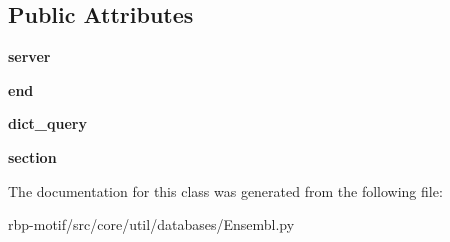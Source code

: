 \subsection*{Public Attributes}
\begin{DoxyCompactItemize}
\item 
\hypertarget{classsrc_1_1core_1_1util_1_1databases_1_1Ensembl_1_1Ensembl_a151c76933d0a67aed4cbf40de94c792e}{{\bfseries server}}\label{classsrc_1_1core_1_1util_1_1databases_1_1Ensembl_1_1Ensembl_a151c76933d0a67aed4cbf40de94c792e}

\item 
\hypertarget{classsrc_1_1core_1_1util_1_1databases_1_1Ensembl_1_1Ensembl_af4bc1c81978e0d06512fdec5330f46a2}{{\bfseries end}}\label{classsrc_1_1core_1_1util_1_1databases_1_1Ensembl_1_1Ensembl_af4bc1c81978e0d06512fdec5330f46a2}

\item 
\hypertarget{classsrc_1_1core_1_1util_1_1databases_1_1Ensembl_1_1Ensembl_ab7d59100515d2843950b7208db4a90ab}{{\bfseries dict\-\_\-query}}\label{classsrc_1_1core_1_1util_1_1databases_1_1Ensembl_1_1Ensembl_ab7d59100515d2843950b7208db4a90ab}

\item 
\hypertarget{classsrc_1_1core_1_1util_1_1databases_1_1Ensembl_1_1Ensembl_abe0848d95dc5ebd1b32cf499c5ac4bff}{{\bfseries section}}\label{classsrc_1_1core_1_1util_1_1databases_1_1Ensembl_1_1Ensembl_abe0848d95dc5ebd1b32cf499c5ac4bff}

\end{DoxyCompactItemize}


The documentation for this class was generated from the following file\-:\begin{DoxyCompactItemize}
\item 
rbp-\/motif/src/core/util/databases/Ensembl.\-py\end{DoxyCompactItemize}
